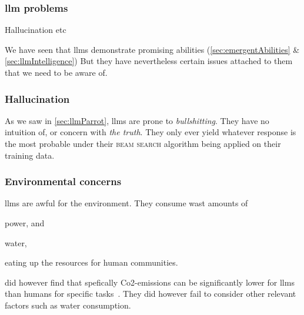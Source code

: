 \subsubsection{\acrshort{llm} problems}\label{sec:llmProblems}

Hallucination etc

We have seen that \acrshort{llms} demonstrate promising abilities
(\cref{sec:emergentAbilities} \& \cref{sec:llmIntelligence}) But they have nevertheless
certain issues attached to them that we need to be aware of.

\subsubsection*{Hallucination}

As we saw in \cref{sec:llmParrot}, \acrshort{llms} are prone to
\textit{bullshitting}. They have no intuition of, or concern with \textit{the
    truth}. They only ever yield whatever response is the most probable under their
\textsc{beam search} algorithm being applied on their training data.

\subsubsection*{Environmental concerns}

\acrshort{llms} are awful for the environment. They consume wast amounts of \begin{inparaenum}
    \item power,
    and
    \item water,
\end{inparaenum}
eating up the resources for human communities.

\citeauthor{llmCarbon} did however find that spefically Co2-emissions can be
significantly lower for \acrshort{llms} than humans for specific
tasks~\cite{llmCarbon}. They did however fail to consider other relevant factors such
as water consumption.

